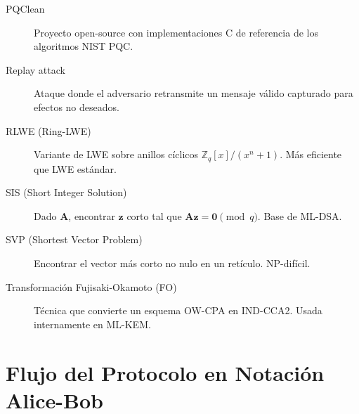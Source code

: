 \documentclass[12pt,a4paper,twoside,openright]{book}
\theoremstyle{plain}
\theoremstyle{definition}
\theoremstyle{remark}
\newcommand{\Z}{\mathbb{Z}}
\newcommand{\vv}[1]{\mathbf{#1}}
\newcommand{\mm}[1]{\mathbf{#1}}
\begin{document}
\begin{description}
  \item[PQClean] Proyecto open-source con implementaciones C de referencia
    de los algoritmos NIST PQC.

  \item[Replay attack] Ataque donde el adversario retransmite un mensaje
    v\'alido capturado para efectos no deseados.

  \item[RLWE (Ring-LWE)] Variante de LWE sobre anillos c\'iclicos $\Z_q[x]/(x^n+1)$.
    M\'as eficiente que LWE est\'andar.

  \item[SIS (Short Integer Solution)] Dado $\mm{A}$, encontrar $\vv{z}$
    corto tal que $\mm{A}\vv{z} = \vv{0} \pmod{q}$. Base de ML-DSA.

  \item[SVP (Shortest Vector Problem)] Encontrar el vector m\'as corto no
    nulo en un ret\'iculo. NP-dif\'icil.

  \item[Transformaci\'on Fujisaki-Okamoto (FO)] T\'ecnica que convierte un
    esquema OW-CPA en IND-CCA2. Usada internamente en ML-KEM.
\end{description}

\chapter{Flujo del Protocolo en Notaci\'on Alice-Bob}
\label{app:alice_bob}
\end{document}

